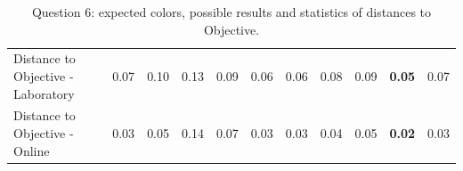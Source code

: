 \begin{table}[H]
{\begin{tabular}{lccccccccccccc}
    \multicolumn{4}{l}{Distance to Objective - Laboratory}                                                                                           & \multicolumn{1}{|c}{0.07}       & \multicolumn{1}{c|}{0.10}    & \multicolumn{1}{|c}{0.13}       & \multicolumn{1}{c|}{0.09}    & \multicolumn{1}{|c}{0.06}       & \multicolumn{1}{c|}{0.06}    & \multicolumn{1}{|c}{0.08}       & \multicolumn{1}{c|}{0.09}    & \multicolumn{1}{|c}{\textbf{0.05}}       & \multicolumn{1}{c|}{0.07}    \\
    \multicolumn{4}{l}{Distance to Objective - Online}                                                                                               & \multicolumn{1}{|c}{0.03}        & \multicolumn{1}{c|}{0.05}    & \multicolumn{1}{|c}{0.14}        & \multicolumn{1}{c|}{0.07}    & \multicolumn{1}{|c}{0.03}       & \multicolumn{1}{c|}{0.03}    & \multicolumn{1}{|c}{0.04}        & \multicolumn{1}{c|}{0.05}    & \multicolumn{1}{|c}{\textbf{0.02}}       & \multicolumn{1}{c|}{0.03}    \\ \hline
    \end{tabular}}
  \caption[Question 6, with expected Results.]{Question 6: expected colors, possible results and statistics of distances to Objective.}
  \label{table:lab_q6_expected}
\end{table}
%
